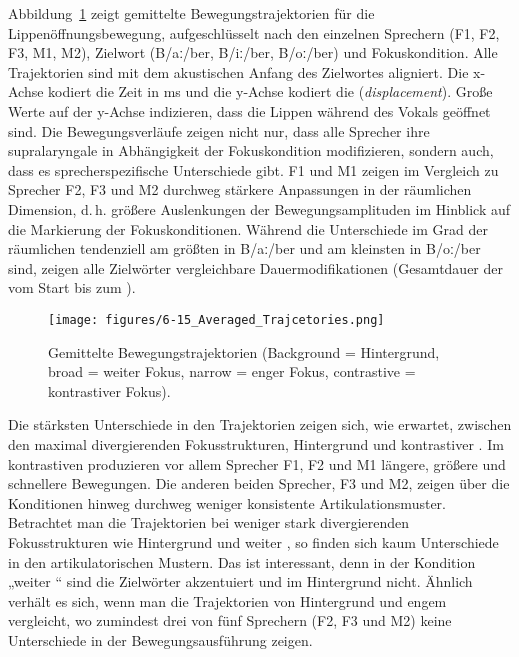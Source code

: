 \clearpage 
Abbildung~\ref{figure:0613} zeigt gemittelte Bewegungstrajektorien für die Lippenöff\-nungs\-bewegung, aufgeschlüsselt nach den einzelnen Sprechern (F1, F2, F3, M1, M2), Zielwort (B/aː/ber, B/iː/ber, B/oː/ber) und Fokuskondition. Alle Trajektorien sind mit dem akustischen Anfang des Zielwortes aligniert. Die x-Achse kodiert die Zeit in ms und die y-Achse kodiert die  (\textit{displacement}). Große Werte auf der y-Achse indizieren, dass die Lippen während des Vokals geöffnet sind. Die Bewegungsverläufe zeigen nicht nur, dass alle Sprecher ihre supralaryngale  in Abhängigkeit der Fokuskondition modifizieren, sondern auch, dass es sprecherspezifische Unterschiede gibt. F1 und M1 zeigen im Vergleich zu Sprecher F2, F3 und M2 durchweg stärkere Anpassungen in der räumlichen Dimension, d.\,h. größere Auslenkungen der Bewegungsamplituden im Hinblick auf die Markierung der Fokuskonditionen. Während die Unterschiede im Grad der räumlichen  tendenziell am größten in B/aː/ber und am kleinsten in B/oː/ber sind, zeigen alle Zielwörter vergleichbare Dauermodifikationen (Gesamtdauer der  vom Start bis zum ).



\begin{figure}
	\texttt{[image: figures/6-15\_Averaged\_Trajcetories.png]}
	\caption{Gemittelte Bewegungstrajektorien (Background = Hintergrund, broad = weiter Fokus, narrow = enger Fokus, contrastive = kontrastiver Fokus).}
	\label{figure:0613}
\end{figure}


Die stärksten Unterschiede in den Trajektorien zeigen sich, wie erwartet, zwischen den maximal divergierenden Fokusstrukturen, Hintergrund und kontrastiver . Im kontrastiven  produzieren vor allem Sprecher F1, F2 und M1 längere, größere und schnellere Bewegungen. Die anderen beiden Sprecher, F3 und M2, zeigen über die Konditionen hinweg durchweg weniger konsistente Artikulationsmuster. Betrachtet man die Trajektorien bei weniger stark divergierenden Fokusstrukturen wie Hintergrund und weiter , so finden sich kaum Unterschiede in den artikulatorischen Mustern. Das ist interessant, denn in der Kondition „weiter “ sind die Zielwörter akzentuiert und im Hintergrund nicht. Ähnlich verhält es sich, wenn man die Trajektorien von Hintergrund und engem  vergleicht, wo zumindest drei von fünf Sprechern (F2, F3 und M2) keine Unterschiede in der Bewegungsausführung zeigen.

